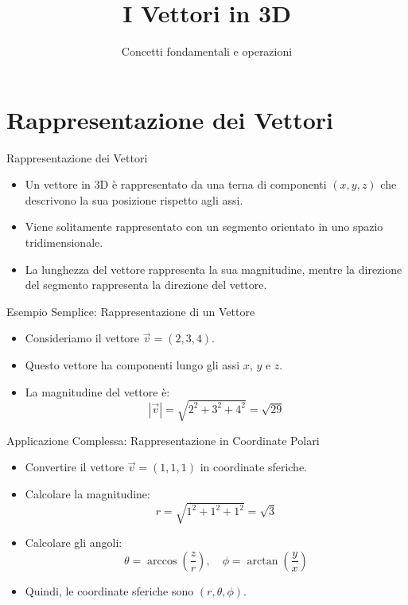 \documentclass{beamer}
\title{I Vettori in 3D}
\subtitle{Concetti fondamentali e operazioni}
\author{}
\institute{}
\date{}
\begin{document}
\begin{frame}
    \titlepage
\end{frame}

\section{Rappresentazione dei Vettori}

\begin{frame}{Rappresentazione dei Vettori}
    \begin{itemize}
        \item Un vettore in 3D è rappresentato da una terna di componenti \((x, y, z)\) che descrivono la sua posizione rispetto agli assi.
        \item Viene solitamente rappresentato con un segmento orientato in uno spazio tridimensionale.
        \item La lunghezza del vettore rappresenta la sua magnitudine, mentre la direzione del segmento rappresenta la direzione del vettore.
    \end{itemize}
\end{frame}

\begin{frame}{Esempio Semplice: Rappresentazione di un Vettore}
    \begin{itemize}
        \item Consideriamo il vettore \(\vec{v} = (2, 3, 4)\).
        \item Questo vettore ha componenti lungo gli assi \(x\), \(y\) e \(z\).
        \item La magnitudine del vettore è:
        \[
        |\vec{v}| = \sqrt{2^2 + 3^2 + 4^2} = \sqrt{29}
        \]
    \end{itemize}
\end{frame}

\begin{frame}{Applicazione Complessa: Rappresentazione in Coordinate Polari}
    \begin{itemize}
        \item Convertire il vettore \(\vec{v} = (1, 1, 1)\) in coordinate sferiche.
        \item Calcolare la magnitudine:
        \[
        r = \sqrt{1^2 + 1^2 + 1^2} = \sqrt{3}
        \]
        \item Calcolare gli angoli:
        \[
        \theta = \arccos\left(\frac{z}{r}\right), \quad \phi = \arctan\left(\frac{y}{x}\right)
        \]
        \item Quindi, le coordinate sferiche sono \((r, \theta, \phi)\).
    \end{itemize}
\end{frame}
\end{document}
